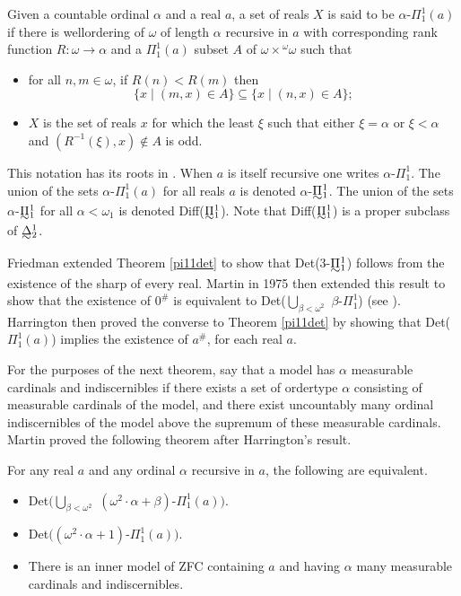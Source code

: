 \documentclass{book}%
\newcommand{\game}{\rotate[u]{\rotate[f]{$\Game$}}}
\def\underTilde#1{{\baselineskip=0pt\vtop{\hbox{$#1$}\hbox{$\sim$}}}{}}
\newcommand{\uTPi}{\underTilde{\Pi}}
\newcommand{\less}{\mathord{<}}
\newcommand{\thing}{\mathord{-}}
\begin{document}
Given a countable ordinal $\alpha$ and a real $a$, a set of reals
$X$ is said to be $\alpha$-$\Pi^{1}_{1}(a)$ if there is wellordering
of $\omega$ of length $\alpha$ recursive in $a$ with corresponding
rank function $R \colon \omega \to \alpha$ and a $\Pi^{1}_{1}(a)$
subset $A$  of $\omega \times {^{\omega}\omega}$ such that
\begin{itemize}
\item for all $n,m \in \omega$, if $R(n) < R(m)$ then
$$\{ x \mid (m,x) \in A\} \subseteq\{ x \mid (n,x) \in A\};$$
\item $X$
is the set of reals $x$ for which the least $\xi$ such that either
$\xi = \alpha$ or $\xi < \alpha$ and $(R^{-1}(\xi), x) \not\in A$ is
odd.
\end{itemize}
This notation has its roots in \cite{Hausdorff:1908}. When $a$ is itself recursive one writes $\alpha$-$\Pi^{1}_{1}$. The
union of the sets $\alpha$-$\Pi^{1}_{1}(a)$ for all reals $a$ is
denoted $\alpha$-$\uTPi^{1}_{1}$. The union of the sets
$\alpha$-$\uTPi^{1}_{1}$ for all $\alpha < \omega_{1}$ is
denoted Diff($\uTPi^{1}_{1}$).
Note that
Diff($\uTPi^{1}_{1}$) is a proper subclass of
$\underTilde{\Delta}^{1}_{2}$.

Friedman  extended Theorem \ref{pi11det} to
show that Det(3-$\uTPi^{1}_{1}$) follows from the existence of
the sharp of every real. Martin in 1975 then extended this result to show that the
existence of $0^{\#}$ is equivalent to Det($\bigcup_{\beta <
\omega^{2}}$ $\beta$-$\Pi^{1}_{1}$) (see \cite{Dubose:1990}).
Harrington
 then proved the converse to Theorem
\ref{pi11det} by showing that Det($\Pi^{1}_{1}(a)$) implies the
existence of $a^{\#}$, for each real $a$.

For the purposes of the next theorem, say that a model has $\alpha$
measurable cardinals and indiscernibles if there exists a set of
ordertype $\alpha$ consisting of measurable cardinals of the model,
and there exist uncountably many ordinal indiscernibles of the
model above the supremum of these measurable cardinals. Martin
proved the following theorem after Harrington's result.

\begin{theorem} For any real $a$ and any ordinal $\alpha$ recursive
in $a$, the following are equivalent.
\begin{itemize}
\item {\rm Det}$(\bigcup_{\beta < \omega^{2}}$ $(\omega^{2} \cdot \alpha +
\beta)$-$\Pi^{1}_{1}(a))$.
\item {\rm Det}$((\omega^{2} \cdot \alpha +
1)$-$\Pi^{1}_{1}(a))$.
\item There is an inner model of\/ {\rm ZFC} containing $a$ and having
$\alpha$ many measurable cardinals and indiscernibles.
\end{itemize}
\end{theorem}
\end{document}
